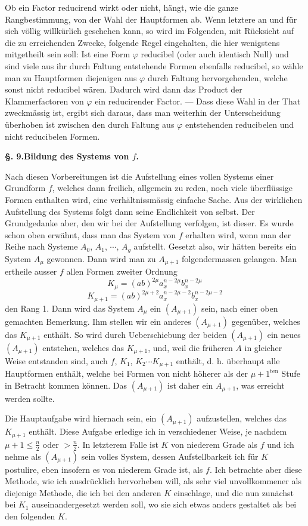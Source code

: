 \documentclass[10pt]{article}
\begin{document}
Ob ein Factor reducirend wirkt oder nicht, hängt, wie die ganze Rangbestimmung, von der Wahl der Hauptformen ab. Wenn letztere an und für sich völlig willkürlich geschehen kann, so wird im Folgenden, mit Rücksicht auf die zu erreichenden Zwecke, folgende Regel eingehalten, die hier wenigstens mitgetheilt sein soll: Ist eine Form $\varphi$ reducibel (oder auch identisch Null) und sind viele aus ihr durch Faltung entstehende Formen ebenfalls reducibel, so wähle man zu Hauptformen diejenigen aus $\varphi$ durch Faltung hervorgehenden, welche sonst nicht reducibel wären. Dadurch wird dann das Product der Klammerfactoren von $\varphi$ ein reducirender Factor. --- Dass diese Wahl in der That zweckmässig ist, ergibt sich daraus, dass man weiterhin der Unterscheidung überhoben ist zwischen den durch Faltung aus $\varphi$ entstehenden reducibelen und nicht reducibelen Formen.

\begin{center}
{\bfseries §. 9.\quad Bildung des Systems von $f$.}
\end{center}

Nach diesen Vorbereitungen ist die Aufstellung eines vollen Systems einer Grundform $f$, welches dann freilich, allgemein zu reden, noch viele überflüssige Formen enthalten wird, eine verhältnissmässig einfache Sache. Aus der wirklichen Aufstellung des Systems folgt dann seine Endlichkeit von selbst. Der Grundgedanke aber, den wir bei der Aufstellung verfolgen, ist dieser. Es wurde schon oben erwähnt, dass man das System von $f$ erhalten wird, wenn man der Reihe nach Systeme $A_0$, $A_1$, $\cdots$, $A_g$ aufstellt. Gesetzt also, wir hätten bereits ein System $A_\mu$ gewonnen. Dann wird man zu $A_{\mu+1}$ folgendermassen gelangen. Man ertheile ausser $f$ allen Formen zweiter Ordnung
\[
K_\mu=(ab)^{2\mu}a_x^{n-2\mu}b_x^{n-2\mu}
\]
\[
K_{\mu+1}=(ab)^{2\mu+2}a_x^{n-2\mu-2}b_x^{n-2\mu-2}
\]
den Rang 1. Dann wird das System $A_\mu$ ein $(A_{\mu+1})$ sein, nach einer oben gemachten Bemerkung. Ihm stellen wir ein anderes $(A_{\mu+1})$ gegenüber, welches das $K_{\mu+1}$ enthält. So wird durch Ueberschiebung der beiden $(A_{\mu+1})$ ein neues $(A_{\mu+1})$ entstehen, welches das $K_{\mu+1}$, und, weil die früheren $A$ in gleicher Weise entstanden sind, auch $f$, $K_1$, $K_2\cdots K_{\mu+1}$ enthält, d. h. überhaupt alle Hauptformen enthält, welche bei Formen von nicht höherer als der $\mu+1^{\mathrm{ten}}$ Stufe in Betracht kommen können. Das $(A_{\mu+1})$ ist daher ein $A_{\mu+1}$, was erreicht werden sollte.

Die Hauptaufgabe wird hiernach sein, ein $(A_{\mu+1})$ aufzustellen, welches das $K_{\mu+1}$ enthält. Diese Aufgabe erledige ich in verschiedener Weise, je nachdem $\mu+1\leq\frac n2$ oder $>\frac n2$. In letzterem Falle ist $K$ von niederem Grade als $f$ und ich nehme als $(A_{\mu+1})$ sein volles System, dessen Aufstellbarkeit ich für $K$ postulire, eben insofern es von niederem Grade ist, als $f$. Ich betrachte aber diese Methode, wie ich ausdrücklich hervorheben will, als sehr viel unvollkommener als diejenige Methode, die ich bei den anderen $K$ einschlage, und die nun zunächst bei $K_1$ auseinandergesetzt werden soll, wo sie sich etwas anders gestaltet als bei den folgenden $K$.
\end{document}
